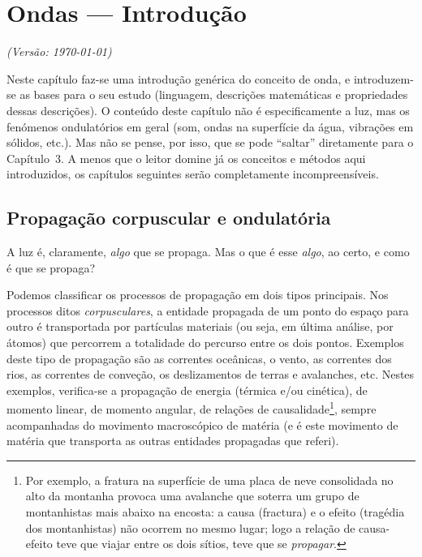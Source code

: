 \chapter{Ondas --- Introdução}\label{sec:wvintr}
\textsl{{\sffamily(Versão: \today)}}

\noindent
Neste capítulo faz-se uma introdução genérica do conceito de onda, e
introduzem-se as bases para o seu estudo (linguagem, descrições matemáticas e
propriedades dessas descrições). O conteúdo deste capítulo não é especificamente
a luz, mas os fenómenos ondulatórios em geral (som, ondas na superfície da água,
vibrações em sólidos, etc.). Mas não se pense, por isso, que se pode ``saltar''
diretamente para o Capítulo~3. A menos que o leitor domine já os conceitos e
métodos aqui introduzidos, os capítulos seguintes serão completamente
incompreensíveis.

\section{Propagação corpuscular e ondulatória}
A luz é, claramente, \emph{algo} que se propaga. Mas o que é esse \emph{algo},
ao certo, e como é que se propaga?

Podemos classificar os processos de propagação em dois tipos principais. Nos
processos ditos \emph{corpusculares}, a entidade propagada de um ponto do espaço
para outro é transportada por partículas materiais (ou seja, em última análise,
por átomos) que percorrem a totalidade do percurso entre os dois pontos.
Exemplos deste tipo de propagação são as correntes oceânicas, o vento, as
correntes dos rios, as correntes de conveção, os deslizamentos de terras e
avalanches, etc. Nestes exemplos, verifica-se a propagação de energia (térmica
e/ou cinética), de momento linear, de momento angular, de relações de
causalidade\footnote{Por exemplo, a fratura na superfície de uma placa de neve
consolidada no alto da montanha provoca uma avalanche que soterra um grupo de
montanhistas mais abaixo na encosta: a causa (fractura) e o efeito (tragédia dos
montanhistas) não ocorrem no mesmo lugar; logo a relação de causa-efeito teve
que viajar entre os dois sítios, teve que se \emph{propagar}.}, sempre
acompanhadas do movimento macroscópico de matéria (e é este movimento de matéria
que transporta as outras entidades propagadas que referi).

